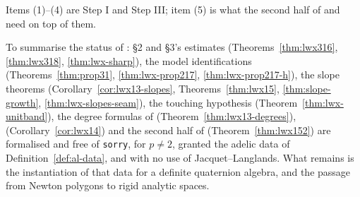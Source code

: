 Items (1)--(4) are Step I and Step III; item (5) is what the second half of
\cite[Theorem 1.5]{LWX} and \cite[Corollary 1.4]{LWX} need on top of them.

To summarise the status of \cite{LWX}: \S2 and \S3's estimates
(Theorems~\ref{thm:lwx316}, \ref{thm:lwx318}, \ref{thm:lwx-sharp}), the model identifications
(Theorems~\ref{thm:prop31}, \ref{thm:lwx-prop217}, \ref{thm:lwx-prop217-h}), the slope theorems
(Corollary~\ref{cor:lwx13-slopes}, Theorems~\ref{thm:lwx15}, \ref{thm:slope-growth},
\ref{thm:lwx-slopes-seam}), the touching hypothesis (Theorem~\ref{thm:lwx-unitband}), the degree
formulas of \cite[Theorem 1.3]{LWX} (Theorem~\ref{thm:lwx13-degrees}), \cite[Corollary 1.4]{LWX}
(Corollary~\ref{cor:lwx14}) and the second half of \cite[Theorem 1.5]{LWX}
(Theorem~\ref{thm:lwx152}) are formalised and free of \texttt{sorry}, for $p \neq 2$, granted the
adelic data of Definition~\ref{def:al-data}, and with no use of Jacquet--Langlands.  What remains
is the instantiation of that data for a definite quaternion algebra, and the passage from Newton
polygons to rigid analytic spaces.
